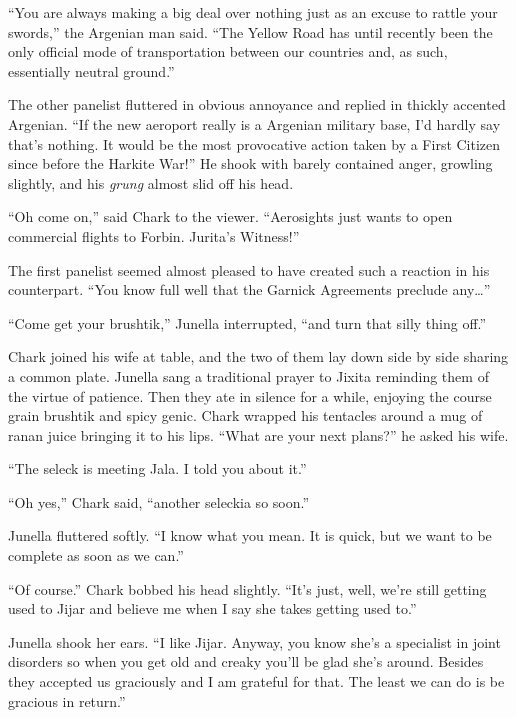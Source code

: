 
``You are always making a big deal over nothing just as an excuse to rattle your swords,'' the
Argenian man said. ``The Yellow Road has until recently been the only official mode of
transportation between our countries and, as such, essentially neutral ground.''


The other panelist fluttered in obvious annoyance and replied in thickly accented Argenian. ``If
the new aeroport really is a Argenian military base, I'd hardly say that's nothing. It would be
the most provocative action taken by a First Citizen since before the Harkite War!'' He shook
with barely contained anger, growling slightly, and his \textit{grung} almost slid off his head.

``Oh come on,'' said Chark to the viewer. ``Aerosights just wants to open commercial flights to
Forbin. Jurita's Witness!''

The first panelist seemed almost pleased to have created such a reaction in his counterpart.
``You know full well that the Garnick Agreements preclude any\ldots''

``Come get your brushtik,'' Junella interrupted, ``and turn that silly thing off.''

Chark joined his wife at table, and the two of them lay down side by side sharing a common
plate. Junella sang a traditional prayer to Jixita reminding them of the virtue of patience.
Then they ate in silence for a while, enjoying the course grain brushtik and spicy genic. Chark
wrapped his tentacles around a mug of ranan juice bringing it to his lips. ``What are your next
plans?'' he asked his wife.

``The seleck is meeting Jala. I told you about it.''

``Oh yes,'' Chark said, ``another seleckia so soon.''

Junella fluttered softly. ``I know what you mean. It is quick, but we want to be complete as
soon as we can.''

``Of course.'' Chark bobbed his head slightly. ``It's just, well, we're still getting used to
Jijar and believe me when I say she takes getting used to.''

Junella shook her ears. ``I like Jijar. Anyway, you know she's a specialist in joint disorders
so when you get old and creaky you'll be glad she's around. Besides they accepted us graciously
and I am grateful for that. The least we can do is be gracious in return.''

